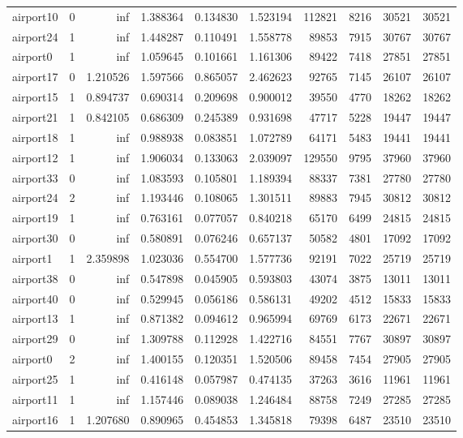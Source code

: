 \begin{longtable}{|l|r|r|r|r|r|r|r|r|r|}
airport10 & 0 & inf & 1.388364 & 0.134830 & 1.523194 & 112821 & 8216 & 30521 & 30521 \\
airport24 & 1 & inf & 1.448287 & 0.110491 & 1.558778 & 89853 & 7915 & 30767 & 30767 \\
airport0 & 1 & inf & 1.059645 & 0.101661 & 1.161306 & 89422 & 7418 & 27851 & 27851 \\
airport17 & 0 & 1.210526 & 1.597566 & 0.865057 & 2.462623 & 92765 & 7145 & 26107 & 26107 \\
airport15 & 1 & 0.894737 & 0.690314 & 0.209698 & 0.900012 & 39550 & 4770 & 18262 & 18262 \\
airport21 & 1 & 0.842105 & 0.686309 & 0.245389 & 0.931698 & 47717 & 5228 & 19447 & 19447 \\
airport18 & 1 & inf & 0.988938 & 0.083851 & 1.072789 & 64171 & 5483 & 19441 & 19441 \\
airport12 & 1 & inf & 1.906034 & 0.133063 & 2.039097 & 129550 & 9795 & 37960 & 37960 \\
airport33 & 0 & inf & 1.083593 & 0.105801 & 1.189394 & 88337 & 7381 & 27780 & 27780 \\
airport24 & 2 & inf & 1.193446 & 0.108065 & 1.301511 & 89883 & 7945 & 30812 & 30812 \\
airport19 & 1 & inf & 0.763161 & 0.077057 & 0.840218 & 65170 & 6499 & 24815 & 24815 \\
airport30 & 0 & inf & 0.580891 & 0.076246 & 0.657137 & 50582 & 4801 & 17092 & 17092 \\
airport1 & 1 & 2.359898 & 1.023036 & 0.554700 & 1.577736 & 92191 & 7022 & 25719 & 25719 \\
airport38 & 0 & inf & 0.547898 & 0.045905 & 0.593803 & 43074 & 3875 & 13011 & 13011 \\
airport40 & 0 & inf & 0.529945 & 0.056186 & 0.586131 & 49202 & 4512 & 15833 & 15833 \\
airport13 & 1 & inf & 0.871382 & 0.094612 & 0.965994 & 69769 & 6173 & 22671 & 22671 \\
airport29 & 0 & inf & 1.309788 & 0.112928 & 1.422716 & 84551 & 7767 & 30897 & 30897 \\
airport0 & 2 & inf & 1.400155 & 0.120351 & 1.520506 & 89458 & 7454 & 27905 & 27905 \\
airport25 & 1 & inf & 0.416148 & 0.057987 & 0.474135 & 37263 & 3616 & 11961 & 11961 \\
airport11 & 1 & inf & 1.157446 & 0.089038 & 1.246484 & 88758 & 7249 & 27285 & 27285 \\
airport16 & 1 & 1.207680 & 0.890965 & 0.454853 & 1.345818 & 79398 & 6487 & 23510 & 23510 \\

\end{longtable}
